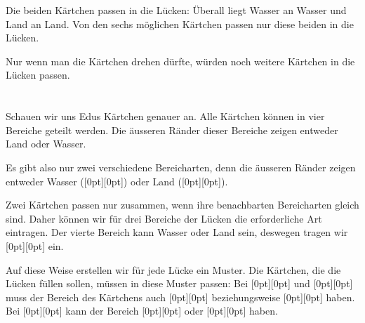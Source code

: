 {{{\centering%
\par}

Die beiden Kärtchen passen in die Lücken: Überall liegt Wasser an Wasser und Land an Land. Von den sechs möglichen Kärtchen passen nur diese beiden in die Lücken.

Nur wenn man die Kärtchen drehen dürfte, würden noch weitere Kärtchen in die Lücken passen.



\section*{\BrochureItsInformatics}
Schauen wir uns Edus Kärtchen genauer an. Alle Kärtchen können in vier Bereiche geteilt werden. Die äusseren Ränder dieser Bereiche zeigen entweder Land oder Wasser.

{\centering%
\par}

Es gibt also nur zwei verschiedene Bereicharten, denn die äusseren Ränder zeigen entweder Wasser (\raisebox{-0.5ex}[0pt][0pt]{}) oder Land (\raisebox{-0.5ex}[0pt][0pt]{}).

{\centering%
\par}

Zwei Kärtchen passen nur zusammen, wenn ihre benachbarten Bereicharten gleich sind. Daher können wir für drei Bereiche der Lücken die erforderliche Art eintragen. Der vierte Bereich kann Wasser oder Land sein, deswegen tragen wir \raisebox{-0.5ex}[0pt][0pt]{} ein.

Auf diese Weise erstellen wir für jede Lücke ein Muster. Die Kärtchen, die die Lücken füllen sollen, müssen in diese Muster passen: Bei \raisebox{-0.5ex}[0pt][0pt]{} und \raisebox{-0.5ex}[0pt][0pt]{} muss der Bereich des Kärtchens auch \raisebox{-0.5ex}[0pt][0pt]{} beziehungsweise \raisebox{-0.5ex}[0pt][0pt]{} haben. Bei \raisebox{-0.5ex}[0pt][0pt]{} kann der Bereich \raisebox{-0.5ex}[0pt][0pt]{} oder \raisebox{-0.5ex}[0pt][0pt]{} haben.

}}
